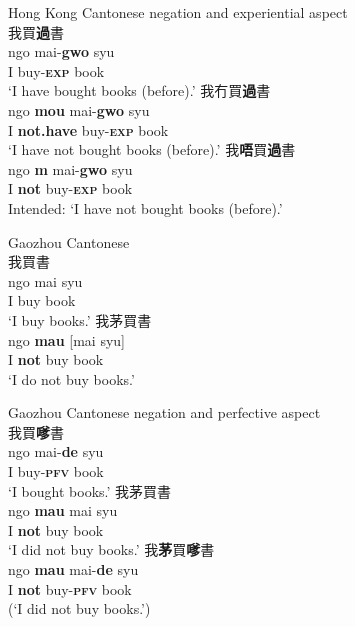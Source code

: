 \documentclass[output=paper]{langscibook}
\begin{document}
\ea Hong Kong Cantonese negation and experiential aspect \label{ex:lam6}\\
  \ea 我買\textbf{過}書 \label{ex:lam6a}\\
  	\gll ngo mai-\textbf{gwo} syu\\
	I buy-\textbf{\textsc{exp}} book\\
	\glt `I have bought books (before).'
  \ex 我冇買\textbf{過}書 \label{ex:lam6b}\\	
  	\gll ngo \textbf{mou} mai-\textbf{gwo} syu \\
  	I \textbf{not.have} buy-\textbf{\textsc{exp}} book\\
  	\glt `I have not bought books (before).'
  \ex 我\textbf{唔}買\textbf{過}書 \label{ex:lam6c}\\	
	\gll *ngo \textbf{m} mai-\textbf{gwo} syu\\
  	I \textbf{not} buy-\textbf{\textsc{exp}} book\\
	\glt Intended: `I have not bought books (before).'
\z\z


\ea Gaozhou Cantonese \label{ex:lam7}\\
  \ea 我買書 \label{ex:lam7a}\\
  	\gll ngo	mai	syu\\
  	I buy book\\
	\glt `I buy books.'
  \ex 我茅買書 \label{ex:lam7b}\\
  	\gll ngo \textbf{mau} [mai syu]\\
  	I \textbf{not} buy book\\
  	\glt `I do not buy books.'
\z\z


\ea Gaozhou Cantonese negation and perfective aspect \label{ex:lam8}\\
  \ea 我買\textbf{嗲}書 \label{ex:lam8a}\\
  	\gll ngo mai-\textbf{de} syu\\
  	I buy-\textbf{\textsc{pfv}} book\\
 	 \glt `I bought books.'	
  \ex 我茅買書 \label{ex:lam8b}\\
  	\gll ngo \textbf{mau} mai syu\\
  	I \textbf{not} buy book\\
  	\glt `I did not buy books.'
  \ex 我\textbf{茅}買\textbf{嗲}書 \label{ex:lam8c}\\
	\gll *ngo \textbf{mau} mai-\textbf{de} syu\\
	I \textbf{not} buy-\textbf{\textsc{pfv}} book\\
	\glt (`I did not buy books.')
\z \z 
\end{document}

